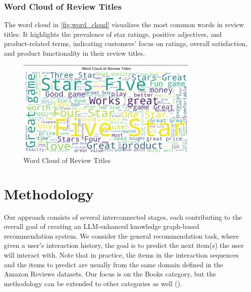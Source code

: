 \documentclass{article}
\begin{document}
\subsubsection{Word Cloud of Review Titles}

The word cloud in \autoref{fig:word_cloud} visualizes the most common words in
review titles. It highlights the prevalence of star ratings, positive
adjectives, and product-related terms, indicating customers' focus on ratings,
overall satisfaction, and product functionality in their review titles.
\begin{figure}[H]
      \centering
      \includegraphics[width=0.8\textwidth]{img/wordcloud.png}
      \caption{Word Cloud of Review Titles}
      \label{fig:word_cloud}
\end{figure}

\section{Methodology}
Our approach consists of several interconnected stages, each contributing to
the overall goal of creating an LLM-enhanced knowledge graph-based
recommendation system. We consider the general recommendation task, where given
a user's interaction history, the goal is to predict the next item(s) the user
will interact with.
Note that in practice, the items in the interaction sequences and the items to
predict are usually from the same domain defined in the Amazon Reviews
datasets.
Our focus is on the Books category, but the methodology can be extended to
other categories as well
(\cite{kang2018selfattentivesequentialrecommendation}).
\end{document}
